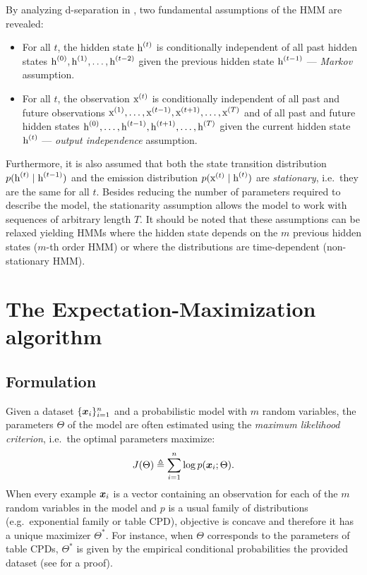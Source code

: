 By analyzing d-separation in , two fundamental assumptions of the HMM are revealed:
\begin{itemize}
    \item For all $t$, the hidden state ${\textnormal{h}}^{(t)}$ is conditionally independent of all past hidden states ${\textnormal{h}}^{(0)},{\textnormal{h}}^{(1)},\dots,{\textnormal{h}}^{(t-2)}$ given the previous hidden state ${\textnormal{h}}^{(t-1)}$ --- \emph{Markov} assumption.
    \item For all $t$, the observation ${\textnormal{x}}^{(t)}$ is conditionally independent of all past and future observations ${\textnormal{x}}^{(1)},\dots,{\textnormal{x}}^{(t-1)},{\textnormal{x}}^{(t+1)},\dots,{\textnormal{x}}^{(T)}$ and of all past and future hidden states ${\textnormal{h}}^{(0)},\dots,{\textnormal{h}}^{(t-1)},{\textnormal{h}}^{(t+1)},\dots,{\textnormal{h}}^{(T)}$ given the current hidden state ${\textnormal{h}}^{(t)}$ --- \emph{output independence} assumption.
\end{itemize}
Furthermore, it is also assumed that both the state transition distribution $p({\textnormal{h}}^{(t)} \mid {\textnormal{h}}^{(t-1)})$ and the emission distribution $p({\textnormal{x}}^{(t)} \mid {\textnormal{h}}^{(t)})$ are \emph{stationary}, i.e.\ they are the same for all $t$. Besides reducing the number of parameters required to describe the model, the stationarity assumption allows the model to work with sequences of arbitrary length $T$. It should be noted that these assumptions can be relaxed yielding HMMs where the hidden state depends on the $m$ previous hidden states ($m$-th order HMM) or where the distributions are time-dependent (non-stationary HMM).

\section{The Expectation-Maximization algorithm}
\label{sec:expectation_maximization}

\subsection{Formulation}
Given a dataset $\lbrace {\bm{x}}_i \rbrace_{i=1}^n$ and a probabilistic model with $m$ random variables, the parameters $\Theta$ of the model are often estimated using the \emph{maximum likelihood criterion}, i.e.\ the optimal parameters maximize:
\begin{equation}
    \label{eq:maximum_likelihood}
    J(\Theta) \triangleq \sum_{i=1}^n \log p({\bm{x}}_i; \Theta).
\end{equation}
When every example ${\bm{x}}_i$ is a vector containing an observation for each of the $m$ random variables in the model and $p$ is a usual family of distributions (e.g.\ exponential family or table CPD), objective  is concave and therefore it has a unique maximizer $\Theta^*$. For instance, when $\Theta$ corresponds to the parameters of table CPDs, $\Theta^*$ is given by the empirical conditional probabilities  the provided dataset (see \citet{Koller2009} for a proof).

